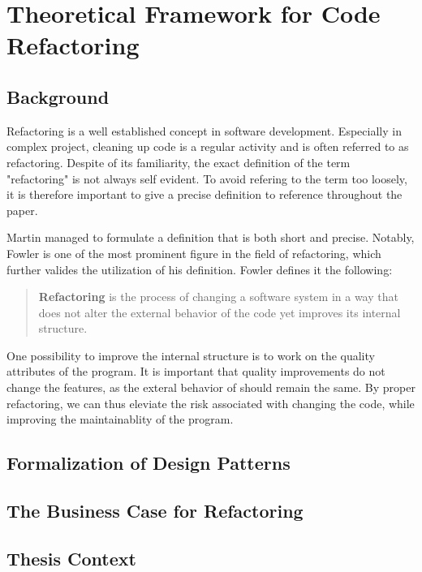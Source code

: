 \chapter{Theoretical Framework for Code Refactoring}

\section{Background}



Refactoring is a well established concept in software development. 
Especially in complex project, 
	cleaning up code is a regular activity and is often referred to as refactoring. 
Despite of its familiarity, 
	the exact definition of the term "refactoring" is not always self evident.
To avoid refering to the term too loosely, 
	it is therefore important to give a precise definition to reference throughout the paper. 

Martin \textcite{fowler2018} managed to formulate a definition that is both short and precise. 
Notably, Fowler is one of the most prominent figure in the field of refactoring,
	which further valides the utilization of his definition.
Fowler defines it the following:

\begin{quote}
\textbf{Refactoring} is the process of changing a software system in a way 
	that does not alter the external behavior of the code yet improves its internal structure.
\end{quote}

One possibility to improve the internal structure is to work on the quality attributes of the program. 
It is important that quality improvements do not change the features, 
	as the exteral behavior of should remain the same. 
By proper refactoring, we can thus eleviate the risk associated with changing the code,
	while improving the maintainablity of the program.






\section{Formalization of Design Patterns}
\section{The Business Case for Refactoring}
\section{Thesis Context}
